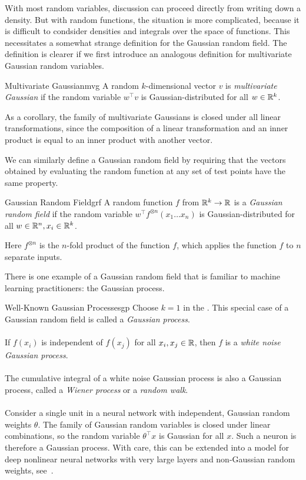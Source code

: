 \documentclass[../../thesis.tex]{subfiles}
\begin{document}
With most random variables,
discussion can proceed directly from writing down a density.
But with random functions,
the situation is more complicated,
because it is difficult to condsider densities and integrals over
the space of functions.
This necessitates a somewhat strange definition for the Gaussian random field.
The definition is clearer if we first introduce an analogous definition
for multivariate Gaussian random variables.

\begin{definition}{Multivariate Gaussian}{mvg}
	A random $k$-dimensional vector $v$ is \emph{multivariate Gaussian} if
	the random variable $w^\top v$ is Gaussian-distributed
	for all $w\in\mathbb{R}^k$.
\end{definition}
As a corollary,
the family of multivariate Gaussians is closed under all linear transformations,
since the composition of a linear transformation and an inner product
is equal to an inner product with another vector.

We can similarly define a Gaussian random field
by requiring that the vectors obtained by
evaluating the random function at any set of test points
have the same property.
\begin{definition}{Gaussian Random Field}{grf}
	A random function $f$ from $\mathbb{R}^k\to\mathbb{R}$ is a \emph{Gaussian random field}
	if the random variable $w^\top f^{\otimes n}(x_1 \dots x_n)$
	is Gaussian-distributed
	for all $w\in\mathbb{R}^n, x_i \in\mathbb{R}^k$.
\end{definition}
Here $f^{\otimes n}$ is the $n$-fold product of the function $f$,
which applies the function $f$ to $n$ separate inputs.

There is one example of a Gaussian random field
that is familiar to machine learning practitioners:
the Gaussian process.

\begin{example}{Well-Known Gaussian Processes}{gp}
	Choose $k = 1$ in the .
	This special case of a Gaussian random field
	is called a \emph{Gaussian process}.
	\\ \ \\
	If $f(x_i)$ is independent of $f(x_j)$
	for all $x_i, x_j \in \mathbb{R}$,
	then $f$ is a
	\emph{white noise Gaussian process}.
	\\ \ \\
	The cumulative integral of a white noise Gaussian process
	is also a Gaussian process,
	called a \emph{Wiener process} or a
	\emph{random walk}.
	\\ \ \\
	Consider a single unit in a neural network with
	independent, Gaussian random weights $\theta$.
	The family of Gaussian random variables
	is closed under linear combinations,
	so the random variable $\theta^\top x$ is Gaussian for all $x$.
	Such a neuron is therefore a Gaussian process.
	With care, this can be extended into a model for
	deep nonlinear neural networks with very large layers and
	non-Gaussian random weights,
	see~\cite{jacot2018}.

\end{example}
\end{document}
